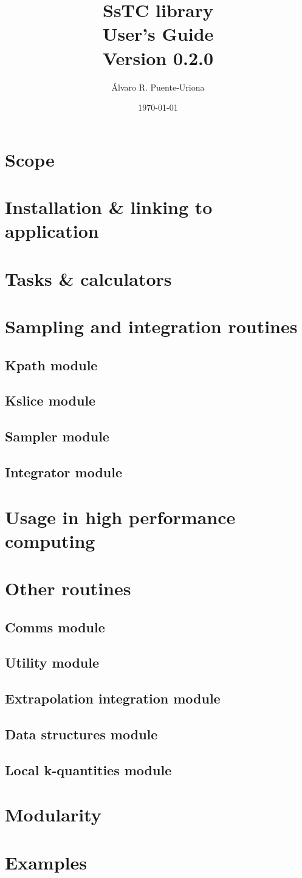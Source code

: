 \documentclass[10pt,a4paper,draft]{article}
\title{SsTC library\\
\large{User's Guide}\\
\large{Version 0.2.0}}
\author{Álvaro R. Puente-Uriona}
\date{\today}
\begin{document}
\maketitle
\tableofcontents
\section{Scope}
\section{Installation \& linking to application}
\section{Tasks \& calculators}
\section{Sampling and integration routines}
\subsection{Kpath module}
\subsection{Kslice module}
\subsection{Sampler module}
\subsection{Integrator module}
\section{Usage in high performance computing}
\section{Other routines}
\subsection{Comms module}
\subsection{Utility module}
\subsection{Extrapolation integration module}
\subsection{Data structures module}
\subsection{Local k-quantities module}
\section{Modularity}
\section{Examples}
\nocite{*}


\end{document}
